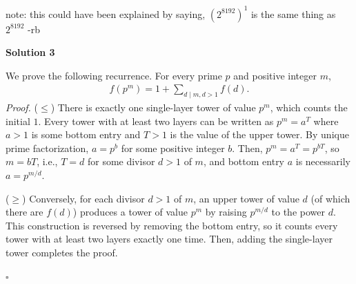 \begin{enumerate}
 note: this could have been explained by saying, $(2^{8192})^1$ is the same thing as $2^{8192}$ -rb

 



\textbf{Solution 3}

We prove the following recurrence. For every prime $p$ and positive integer $m$,\begin{align*}f(p^m) = 1 + \sum_{d \mid m, d > 1} f(d).\end{align*}
\textit{Proof.} ($\leq$) There is exactly one single-layer tower of value $p^m$, which counts the initial $1$. Every tower with at least two layers can be written as $p^m = a^T$ where $a > 1$ is some bottom entry and $T > 1$ is the value of the upper tower. By unique prime factorization, $a = p^b$ for some positive integer $b$. Then, $p^m = a^T = p^{bT}$, so $m = bT$, i.e., $T = d$ for some divisor $d > 1$ of $m$, and bottom entry $a$ is necessarily $a = p^{m / d}$.

 ($\geq$) Conversely, for each divisor $d > 1$ of $m$, an upper tower of value $d$ (of which there are $f(d)$) produces a tower of value $p^m$ by raising $p^{m / d}$ to the power $d$. This construction is reversed by removing the bottom entry, so it counts every tower with at least two layers exactly one time. Then, adding the single-layer tower completes the proof.

 $\square$


\end{enumerate}
